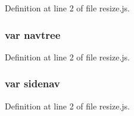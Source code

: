 Definition at line 2 of file resize.\+js.

\subsubsection[{navtree}]{\setlength{\rightskip}{0pt plus 5cm}var navtree}\label{resize_8js_a711d37a3374012d4f6060fffe0abea55}


Definition at line 2 of file resize.\+js.

\subsubsection[{sidenav}]{\setlength{\rightskip}{0pt plus 5cm}var sidenav}\label{resize_8js_a9a7b07fe0df5af5957564912e842c0a4}


Definition at line 2 of file resize.\+js.


